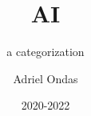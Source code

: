 \documentclass{vwa}
\title{AI}
\subtitle{a categorization}
\author{Adriel Ondas}
\date{2020-2022} %
\begin{document}
\mymaketitle

\tableofcontents

% 




\listoffigures



\appendix

% 
\end{document}
